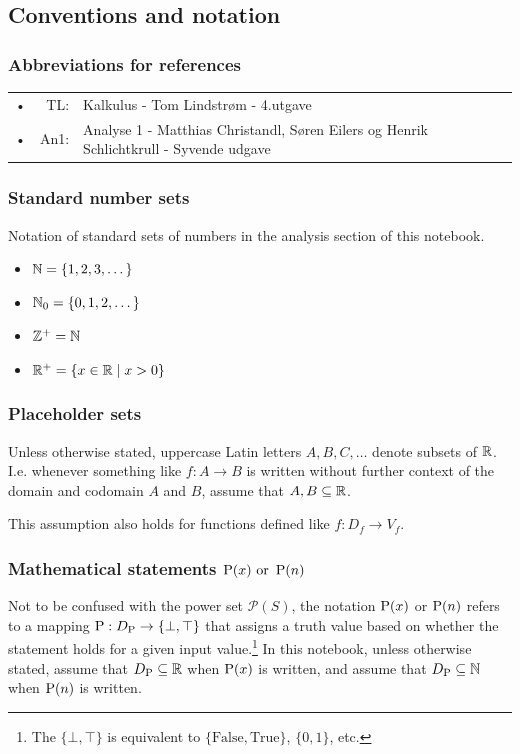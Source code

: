 \subsection{Conventions and notation}
\subsubsection{Abbreviations for references}
\begin{tabular}{lrl}
    •\!\!&TL: & Kalkulus - Tom Lindstrøm - 4.utgave \\
    •\!\!&An1: & Analyse 1 - Matthias Christandl, Søren Eilers og Henrik Schlichtkrull - Syvende udgave
\end{tabular}

\subsubsection{Standard number sets}
Notation of standard sets of numbers in the analysis section of this notebook.
\begin{itemize}
    \item \(\mathbb{N} = \{1,2,3,\dots\}\)
    \item \(\mathbb{N}_0 = \{0,1,2,\dots\}\)
    \item \(\mathbb{Z}^+ = \mathbb{N}\)
    \item \(\mathbb{R}^+ = \{x \in \mathbb{R} \mid x > 0\}\)
\end{itemize}

\subsubsection{Placeholder sets}
Unless otherwise stated, uppercase Latin letters \(A, B, C, \dots\) denote subsets of \(\mathbb{R}\). I.e. whenever something like \(f : A \to B\) is written without further context of the domain and codomain \(A\) and \(B\), assume that \(A, B \subseteq \mathbb{R}\).

This assumption also holds for functions defined like \(f : D_f \to V_f\).

\subsubsection{Mathematical statements \texorpdfstring{\(\operatorname{P}(x) \text{ or } \operatorname{P}(n)\)}{}}
Not to be confused with the power set \(\mathcal{P}(S)\), the notation \(\operatorname{P}(x)\) or \(\operatorname{P}(n)\) refers to a mapping \(\operatorname{P} : D_{\operatorname{P}} \to \{\bot, \top\}\) that assigns a truth value based on whether the statement holds for a given input value.\footnote{The \(\{\bot, \top\}\) is equivalent to \(\{\text{False},\text{True}\}\), \(\{0,1\}\), etc.} In this notebook, unless otherwise stated, assume that \(D_{\operatorname{P}} \subseteq \mathbb{R}\) when \(\operatorname{P}(x)\) is written, and assume that \(D_{\operatorname{P}} \subseteq \mathbb{N}\) when \(\operatorname{P}(n)\) is written.

